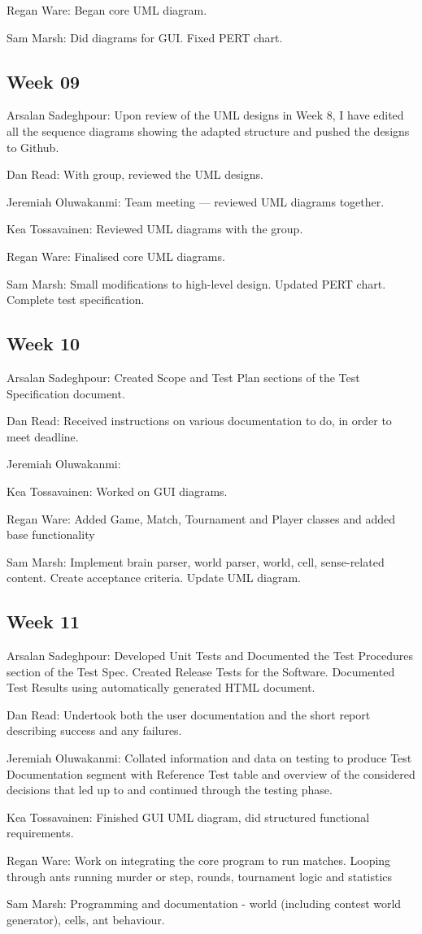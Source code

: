 \documentclass[11pt]{article}
\begin{document}
Regan Ware: Began core UML diagram.

Sam Marsh: Did diagrams for GUI. Fixed PERT chart.

\subsection{Week 09}

Arsalan Sadeghpour: Upon review of the UML designs in Week 8, I have edited all the sequence diagrams showing the adapted structure and pushed the designs to Github.

Dan Read: With group, reviewed the UML designs.

Jeremiah Oluwakanmi: Team meeting --- reviewed UML diagrams together.

Kea Tossavainen: Reviewed UML diagrams with the group.

Regan Ware: Finalised core UML diagrams.

Sam Marsh: Small modifications to high-level design. Updated PERT chart. Complete test specification.

\subsection{Week 10}

Arsalan Sadeghpour: Created Scope and Test Plan sections of the Test Specification document.

Dan Read: Received instructions on various documentation to do, in order to meet deadline.

Jeremiah Oluwakanmi:

Kea Tossavainen: Worked on GUI diagrams.

Regan Ware: Added Game, Match, Tournament and Player classes and added base functionality

Sam Marsh: Implement brain parser, world parser, world, cell, sense-related content. Create acceptance criteria. Update UML diagram.

\subsection{Week 11}

Arsalan Sadeghpour: Developed Unit Tests and Documented the Test Procedures section of the Test Spec. Created Release Tests for the Software. Documented Test Results using automatically generated HTML document.

Dan Read: Undertook both the user documentation and the short report describing success and any failures.

Jeremiah Oluwakanmi: Collated information and data on testing to produce Test Documentation segment with Reference Test table and overview of the considered decisions that led up to and continued through the testing phase.

Kea Tossavainen: Finished GUI UML diagram, did structured functional requirements.

Regan Ware: Work on integrating the core program to run matches. Looping through ants running murder or step, rounds, tournament logic and statistics

Sam Marsh: Programming and documentation - world (including contest world generator), cells, ant behaviour.
\end{document}
